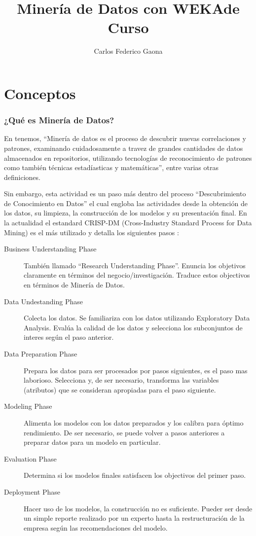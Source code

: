 \documentclass[10pt,a4paper]{article}
\author{Carlos Federico Gaona}
\title{Minería de Datos con WEKA\nNotas de Curso}
\date{}
\begin{document}
\part{Conceptos}
\section{¿Qué es Minería de Datos?}
En \cite{larose2014discovering} tenemos, ``Minería de datos es el proceso de descubrir nuevas correlaciones y patrones, examinando cuidadosamente a travez de grandes cantidades de datos almacenados en repositorios, utilizando tecnologías de reconocimiento de patrones como también técnicas estadíasticas y matemáticas'', entre varias otras definiciones.

Sin embargo, esta actividad es un paso más dentro del proceso ``Descubrimiento de Conocimiento en Datos'' el cual engloba las actividades desde la obtención de los datos, su limpieza, la construcción de los modelos y su presentación final. En la actualidad el estandard CRISP-DM (Cross-Industry Standard Process for Data Mining) es el más utilizado \cite{oct2014poll} y detalla los siguientes pasos \cite{larose2014discovering}:
\begin{description}
\item[Business Understanding Phase] También llamado ``Research Understanding Phase''. Enuncia los objetivos claramente en términos del negocio/investigación. Traduce estos objectivos en términos de Minería de Datos.
\item[Data Undestanding Phase] Colecta los datos. Se familiariza con los datos utilizando Exploratory Data Analysis. Evalúa la calidad de los datos y selecciona los subconjuntos de interes según el paso anterior.
\item[Data Preparation Phase] Prepara los datos para ser procesados por pasos siguientes, es el paso mas laborioso. Selecciona y, de ser necesario, transforma las variables (atributos) que se consideran apropiadas para el paso siguiente.
\item[Modeling Phase] Alimenta los modelos con los datos preparados y los calibra para óptimo rendimiento. De ser necesario, se puede volver a pasos anteriores a preparar datos para un modelo en particular.
\item[Evaluation Phase] Determina si los modelos finales satisfacen los objectivos del primer paso.
\item[Deployment Phase] Hacer uso de los modelos, la construcción no es suficiente. Pueder ser desde un simple reporte realizado por un experto hasta la restructuración de la empresa según las recomendaciones del modelo.
\end{description}
\end{document}
